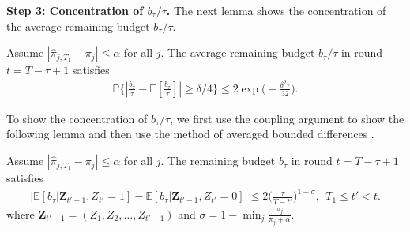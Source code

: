 \textbf{Step 3: Concentration of $b_{\tau}/\tau$.} The next lemma shows the concentration of the average remaining budget $b_\tau/\tau$.
\begin{lemma} \label{thm:concentration_aver_remain_budget}
Assume $|\hat{\pi}_{j,T_1} - \pi_j| \leq \alpha$ for all $j$. The average remaining budget $b_\tau/\tau$ in round $t = T- \tau + 1$ satisfies
\begin{eqnarray}\label{eq:concentration_aver_remain_budget}
\mathbb{P}\big\{|\frac{b_\tau}{\tau} - \mathbb{E}[\frac{b_\tau}{\tau}]| \geq \delta/4\big\} \leq 2\exp\big(-\frac{\delta^2\tau}{32}\big).
\end{eqnarray}
\end{lemma}

To show the concentration of $b_{\tau}/\tau$, we first use the coupling argument to show the following lemma and then use the method of averaged bounded differences \cite{Dubhashi2009Concentration}.
\begin{lemma} \label{thm:bounded_diff}
Assume $|\hat{\pi}_{j,T_1} - \pi_j| \leq \alpha$ for all $j$. The remaining budget $b_\tau$ in round $t = T- \tau + 1$ satisfies
\begin{eqnarray}
\big|\mathbb{E}[b_\tau | \boldsymbol{Z}_{t'-1}, Z_{t'} =1] - \mathbb{E}[b_{\tau}|\boldsymbol{Z}_{t'-1}, Z_{t'} = 0]\big| \leq 2\big(\frac{\tau}{T- t'}\big)^{1-\sigma}, ~~T_1 \leq t' < t.
\end{eqnarray}
where $\boldsymbol{Z}_{t'-1} = (Z_1, Z_2, \ldots, Z_{t'-1})$ and $\sigma = 1- \min_j \frac{\pi_j}{\pi_j + \alpha}$.
\end{lemma}
